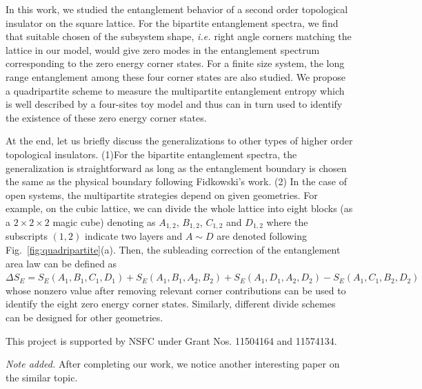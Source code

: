 \documentclass[doublecol]{epl2} %
\newcommand{\ie}{\textit{i.e.{ }}}
\begin{document}
In this work, we studied the entanglement behavior of a second order topological insulator on the square lattice. For the bipartite entanglement spectra, we find that suitable chosen of the subsystem shape, \ie right angle corners matching the lattice in our model, would give zero modes in the entanglement spectrum corresponding to the zero energy corner states. For a finite size system, the long range entanglement among these four corner states are also studied. We propose a quadripartite scheme to measure the multipartite entanglement entropy which is well described by a four-sites toy model and thus can in turn used to identify the existence of these zero energy corner states. 

At the end, let us briefly discuss the generalizations to other types of higher order topological insulators. (1)For the bipartite entanglement spectra, the generalization is straightforward as long as the entanglement boundary is chosen the same as the physical boundary following Fidkowski's work. \cite{Fidkowski_PRL_2010} (2) In the case of open systems, the multipartite strategies depend on given geometries. For example, on the cubic lattice, we can divide the whole lattice into eight blocks (as a $2\times2\times2$ magic cube) denoting as $A_{1,2}$, $B_{1,2}$, $C_{1,2}$ and $D_{1,2}$ where the subscripts $(1,2)$ indicate two layers and $A\sim D$ are denoted following Fig.~\ref{fig:quadripartite}(a). Then, the subleading correction of the entanglement area law can be defined as $\Delta S_E= S_E(A_1,B_1,C_1,D_1)+S_E(A_1,B_1,A_2,B_2)+S_E(A_1,D_1,A_2,D_2)-S_E(A_1,C_1,B_2,D_2)$ whose nonzero value after removing relevant corner contributions can be used to identify the eight zero energy corner states. Similarly, different divide schemes can be designed for other geometries. 


\acknowledgments
This project is supported by NSFC under Grant Nos. 11504164 and 11574134.

{\it Note added.} After completing our work, we notice another interesting paper \cite{Fukui_PRB_2018} on the similar topic.

%
%
%
%


\end{document}
